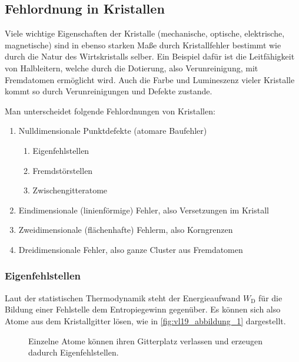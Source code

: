 \setcounter{section}{4}
\setcounter{subsection}{2}
\setcounter{equation}{0}
\setcounter{figure}{4}

\subsection{Fehlordnung in Kristallen}
	Viele wichtige Eigenschaften der Kristalle (mechanische, optische, elektrische, magnetische) sind in ebenso starken Maße durch Kristallfehler bestimmt wie durch die Natur des Wirtskristalls selber. 
	Ein Beispiel dafür ist die Leitfähigkeit von Halbleitern, welche durch die Dotierung, also Verunreinigung, mit Fremdatomen ermöglicht wird. 
	Auch die Farbe und Lumineszenz vieler Kristalle kommt so durch Verunreinigungen und Defekte zustande.

	Man unterscheidet folgende Fehlordnungen von Kristallen:
	\begin{enumerate}
		\item Nulldimensionale Punktdefekte (atomare Baufehler)
			\begin{enumerate}
				\item Eigenfehlstellen
				\item Fremdstörstellen
				\item Zwischengitteratome
			\end{enumerate}
		\item Eindimensionale (linienförmige) Fehler, also Versetzungen im Kristall
		\item Zweidimensionale (flächenhafte) Fehlerm, also Korngrenzen
		\item Dreidimensionale Fehler, also ganze Cluster aus Fremdatomen
	\end{enumerate}

\subsubsection{Eigenfehlstellen}
	Laut der statistischen Thermodynamik steht der Energieaufwand $W_\mathrm{D}$ für die Bildung einer Fehlstelle dem Entropiegewinn gegenüber. 
	Es können sich also Atome aus dem Kristallgitter lösen, wie in \autoref{fig:vl19_abbildung_1} dargestellt.
	\begin{figure}[H]
		\centering
		\caption{Einzelne Atome können ihren Gitterplatz verlassen und erzeugen dadurch Eigenfehlstellen.}
		\label{fig:vl19_abbildung_1}
	\end{figure}

